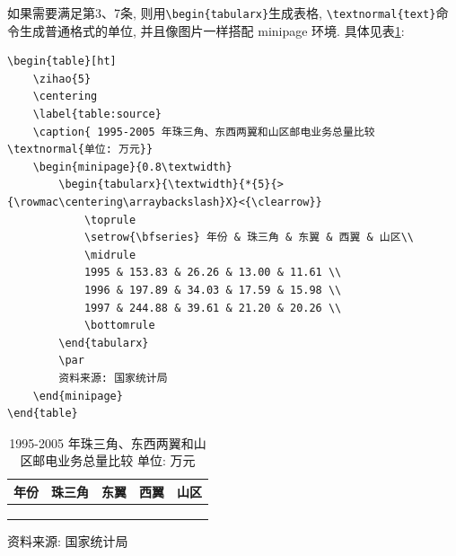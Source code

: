 如果需要满足第3、7条, 则用\verb|\begin{tabularx}|生成表格, \verb|\textnormal{text}|命令生成普通格式的单位, 并且像图片一样搭配 minipage 环境. 具体见表\ref{table:source}:
\begin{lstlisting}
\begin{table}[ht]
    \zihao{5}
    \centering
    \label{table:source}
    \caption{ 1995-2005 年珠三角、东西两翼和山区邮电业务总量比较 \textnormal{单位: 万元}}
    \begin{minipage}{0.8\textwidth}
        \begin{tabularx}{\textwidth}{*{5}{>{\rowmac\centering\arraybackslash}X}<{\clearrow}}
            \toprule
            \setrow{\bfseries} 年份 & 珠三角 & 东翼 & 西翼 & 山区\\
            \midrule
            1995 & 153.83 & 26.26 & 13.00 & 11.61 \\
            1996 & 197.89 & 34.03 & 17.59 & 15.98 \\
            1997 & 244.88 & 39.61 & 21.20 & 20.26 \\
            \bottomrule
        \end{tabularx}
        \par
        资料来源: 国家统计局
    \end{minipage}
\end{table}
\end{lstlisting}
\begin{table}[!h]
    \centering
    \caption{ 1995-2005 年珠三角、东西两翼和山区邮电业务总量比较 \textnormal{单位: 万元}}
    \label{table:source}
    \begin{minipage}{0.8\textwidth}
        \begin{tabularx}{\textwidth}{*{5}{>{\rowmac\centering\arraybackslash}X}<{\clearrow}}
            \toprule
            \setrow{\bfseries} 年份 & 珠三角    & 东翼    & 西翼    & 山区    \\
            \midrule
            1995                  & 153.83 & 26.26 & 13.00 & 11.61 \\
            1996                  & 197.89 & 34.03 & 17.59 & 15.98 \\
            1997                  & 244.88 & 39.61 & 21.20 & 20.26 \\
            \bottomrule
        \end{tabularx}
        \par
         资料来源: 国家统计局
    \end{minipage}
\end{table}

